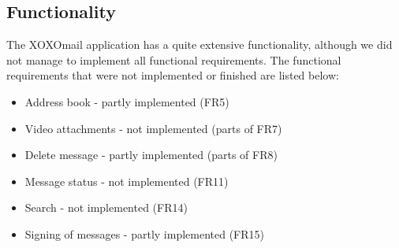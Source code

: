 \subsection{Functionality}
The XOXOmail application has a quite extensive functionality, although we did not manage to implement all functional requirements.
The functional requirements that were not implemented or finished are listed below:
\begin{itemize}
\item{}Address book - partly implemented (FR5)
\item{}Video attachments - not implemented (parts of FR7)
\item{}Delete message - partly implemented (parts of FR8)
\item{}Message status - not implemented (FR11)
\item{}Search - not implemented (FR14)
\item{}Signing of messages - partly implemented (FR15)
\end{itemize}